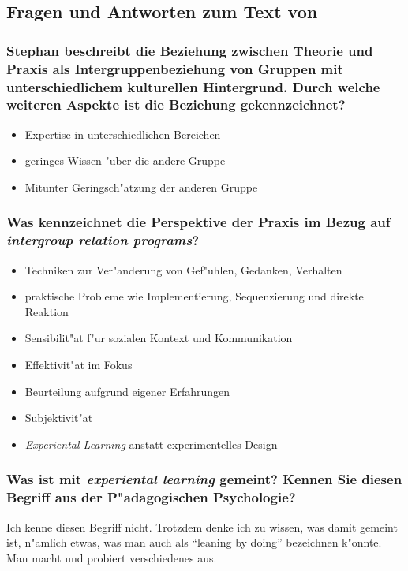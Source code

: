 \subsection{Fragen und Antworten zum Text von \textcite{stephan_bridging_2006}}
\subsubsection{Stephan beschreibt die Beziehung zwischen Theorie und Praxis als Intergruppenbeziehung von Gruppen mit unterschiedlichem kulturellen Hintergrund. Durch welche weiteren Aspekte ist die Beziehung gekennzeichnet?}
\begin{itemize}
        \item Expertise in unterschiedlichen Bereichen
        \item geringes Wissen "uber die andere Gruppe
        \item Mitunter Geringsch"atzung der anderen Gruppe
\end{itemize}

\subsubsection{Was kennzeichnet die Perspektive der Praxis im Bezug auf \emph{intergroup relation programs}?}
\begin{itemize}
        \item Techniken zur Ver"anderung von Gef"uhlen, Gedanken, Verhalten
        \item praktische Probleme wie Implementierung, Sequenzierung und direkte Reaktion
        \item Sensibilit"at f"ur sozialen Kontext und Kommunikation
        \item Effektivit"at im Fokus
        \item Beurteilung aufgrund eigener Erfahrungen
        \item Subjektivit"at
        \item \emph{Experiental Learning} anstatt experimentelles Design
\end{itemize}

\subsubsection{Was ist mit \emph{experiental learning} gemeint? Kennen Sie diesen Begriff aus der P"adagogischen Psychologie?}
Ich kenne diesen Begriff nicht. Trotzdem denke ich zu wissen, was damit gemeint ist, n"amlich etwas, was man auch als ``leaning by doing'' bezeichnen k"onnte. Man macht und probiert verschiedenes aus.

